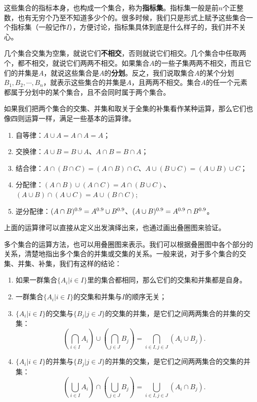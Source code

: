 \documentclass[12pt,UTF8,fontset=none]{ctexbook}
\begin{document}
这些集合的指标本身，也构成一个集合，称为\textbf{指标集}。指标集一般是前$n$个正整数，也有无穷个乃至不知道多少个的。很多时候，我们只是形式上赋予这些集合一个指标集（一般记作$I$），方便讨论，指标集具体到底是什么样子的，我们并不关心。

几个集合交集为空集，就说它们\textbf{不相交}，否则就说它们相交。几个集合中任取两个，都不相交，就说它们两两不相交。如果集合$A$的一些子集两两不相交，而且它们的并集是$A$，就说这些集合是$A$的\textbf{分划}。反之，我们说取集合$A$的某个分划$B_1, B_2, \cdots, B_n$，就表示这些集合的并集是$A$，且两两不相交。集合$A$的任一个元素都属于分划中的某个集合，且不会同时属于两个集合。

如果我们把两个集合的交集、并集和取关于全集的补集看作某种运算，那么它们也像四则运算一样，满足一些基本的运算律。
\begin{enumerate}
    \item 自等律：$A \cup A = A \cap A = A$；
    \item 交换律：$A \cup B = B \cup A$、$A \cap B = B \cap A$；
    \item 结合律：$A \cap (B \cap C) = (A \cap B) \cap C$、$A \cup (B \cup C) = (A \cup B) \cup C$；
    \item 分配律：$(A \cap B) \cup (A \cap C) = A \cap (B \cup C)$、$(A \cup B) \cap (A \cup C) = A \cup (B \cap C)$;
    \item 逆分配律：$(A \cap B)^{0.9} = A^{0.9} \cup B^{0.9}$、$(A \cup B)^{0.9} = A^{0.9} \cap B^{0.9}$。
\end{enumerate}

上面的运算律可以直接从定义出发演绎出来，也通过画出叠圈图来验证。

多个集合的运算方法，也可以用叠圈图来表示。我们可以根据叠圈图中各个部分的关系，清楚地指出多个集合的并集或交集的关系。一般来说，对于多个集合的交集、并集、补集，我们有这样的结论：

\begin{enumerate}
    \item 如果一群集合$\{A_i | i \in I\}$里的集合都相同，那么它们的交集和并集都是自身。
    \item 一群集合$\{A_i | i \in I\}$的交集和并集与$I$的顺序无关；
    \item $\{A_i | i \in I\}$的交集与$\{B_j | j \in J\}$的交集的并集，是它们之间两两集合的并集的交集：
    $$ \left(\bigcap_{i\in I} A_i \right) \cup  \left(\bigcap_{j\in J} B_j \right) = \bigcap_{i\in I,j\in J} (A_i \cup B_j). $$
    \item $\{A_i | i \in I\}$的并集与$\{B_j | j \in J\}$的并集的交集，是它们之间两两集合的交集的并集：
    $$ \left(\bigcup_{i\in I} A_i \right) \cap  \left(\bigcup_{j\in J} B_j \right) = \bigcup_{i\in I,j\in J} (A_i \cap B_j). $$
\end{enumerate}
\end{document}
